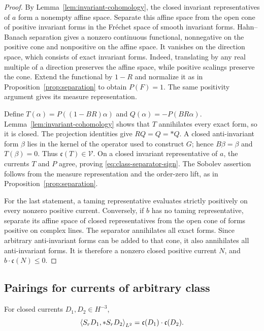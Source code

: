 \begin{proof}
By Lemma~\ref{lem:invariant-cohomology}, the closed invariant
representatives of \(a\) form a nonempty affine space. Separate
this affine space from the open cone of positive invariant forms
in the Fr\'echet space of smooth invariant forms. Hahn--Banach
separation gives a nonzero continuous functional, nonnegative on
the positive cone and nonpositive on the affine space. It vanishes
on the direction space, which consists of exact invariant forms.
Indeed, translating by any real multiple of a direction preserves
the affine space, while positive scalings preserve the cone.
Extend the functional by \(1-R\) and normalize it as in
Proposition~\ref{prop:separation} to obtain \(P(F)=1\).
The same positivity argument gives its measure representation.

Define \(T(\alpha)=P((1-BR)\alpha)\) and
\(Q(\alpha)=-P(BR\alpha)\). Lemma~\ref{lem:invariant-cohomology}
shows that \(T\) annihilates every exact form, so it is closed.
The projection identities give \(RQ=Q=*Q\). A closed
anti-invariant form \(\beta\) lies in the kernel of the operator
used to construct \(G\); hence \(B\beta=\beta\) and
\(T(\beta)=0\). Thus \(\mathfrak c(T)\in\mathcal V\).
On a closed invariant representative of \(a\), the currents
\(T\) and \(P\) agree, proving \eqref{eq:class-separator-sign}.
The Sobolev assertion follows from the measure representation and
the order-zero lift, as in Proposition~\ref{prop:separation}.

For the last statement, a taming representative evaluates strictly
positively on every nonzero positive current. Conversely, if \(b\)
has no taming representative, separate its affine space of closed
representatives from the open cone of forms positive on complex
lines. The separator annihilates all exact forms. Since arbitrary
anti-invariant forms can be added to that cone, it also annihilates
all anti-invariant forms. It is therefore a nonzero closed positive
current \(N\), and \(b\cdot\mathfrak c(N)\le0\).
\end{proof}

\subsection{Pairings for currents of arbitrary class}

\begin{lemma}\label{lem:cohomological-pairing}
For closed currents \(D_1,D_2\in H^{-3}\),
\begin{equation}\label{eq:cohomological-pairing}
 \left\langle S_rD_1,*S_rD_2\right\rangle_{L^2}
 =\mathfrak c(D_1)\cdot\mathfrak c(D_2).
\end{equation}
\end{lemma}

